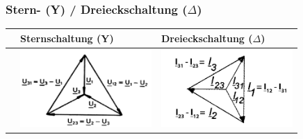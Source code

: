 		\subsubsection{Stern- (Y) / Dreieckschaltung ($\Delta$)}
            	\renewcommand{\arraystretch}{1.5}
			\begin{tabular}{| p{4.5cm} | l | l |}
				\hline
	 				& Sternschaltung (Y)		& Dreieckschaltung ($\Delta$)\\
	 			\hline
	 			\vspace{0.2cm}
	 				&
	 					\includegraphics[width=5cm]{bilder/Sternspannung.png} &
	 					\includegraphics[width=5cm]{bilder/Dreieckstrom.png} \\
	 				

\end{tabular}
